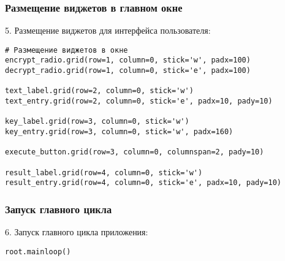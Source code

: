 \documentclass[12pt,a4paper]{scrartcl}
\begin{document}
\subsubsection{Размещение виджетов в главном окне}
5. Размещение виджетов для интерфейса пользователя:
\begin{verbatim}
# Размещение виджетов в окне
encrypt_radio.grid(row=1, column=0, stick='w', padx=100)
decrypt_radio.grid(row=1, column=0, stick='e', padx=100)

text_label.grid(row=2, column=0, stick='w')
text_entry.grid(row=2, column=0, stick='e', padx=10, pady=10)

key_label.grid(row=3, column=0, stick='w')
key_entry.grid(row=3, column=0, stick='w', padx=160)

execute_button.grid(row=3, column=0, columnspan=2, pady=10)

result_label.grid(row=4, column=0, stick='w')
result_entry.grid(row=4, column=0, stick='e', padx=10, pady=10)
\end{verbatim}

\subsubsection{Запуск главного цикла}
6. Запуск главного цикла приложения:
\begin{verbatim}
root.mainloop()
\end{verbatim}

\newpage
\end{document}
